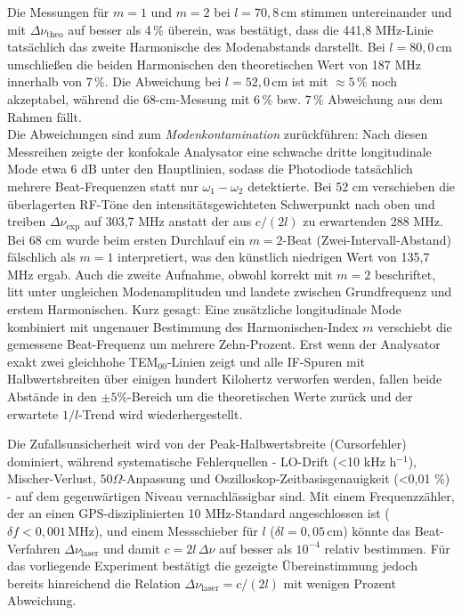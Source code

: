 Die Messungen für $m=1$ und $m=2$ bei $l=70{,}8\,\mathrm{cm}$ stimmen untereinander und mit $\Delta\nu_{\mathrm{theo}}$ auf besser als 4\,\% überein, was bestätigt, dass die 441{,}8 MHz-Linie tatsächlich das zweite Harmonische des Modenabstands darstellt. Bei $l=80{,}0\,\mathrm{cm}$ umschließen die beiden Harmonischen den theoretischen Wert von 187 MHz innerhalb von 7\,\%.  Die Abweichung bei $l=52{,}0\,\mathrm{cm}$ ist mit $\approx 5\,\%$ noch akzeptabel, während die 68-cm-Messung mit $6\,\%$ bsw. $7\,\%$ Abweichung aus dem Rahmen fällt.\\
Die Abweichungen sind zum \emph{Modenkontamination} zurückführen: Nach diesen Messreihen zeigte der konfokale Analysator eine schwache dritte longitudinale Mode etwa 6 dB unter den Hauptlinien, sodass die Photodiode tatsächlich mehrere Beat-Frequenzen statt nur $\omega_{1} - \omega_{2}$ detektierte. Bei 52 cm verschieben die überlagerten RF-Töne den intensitätsgewichteten Schwerpunkt nach oben und treiben $\Delta\nu_{\mathrm{exp}}$ auf 303,7 MHz anstatt der aus $c/(2l)$ zu erwartenden 288 MHz. Bei 68 cm wurde beim ersten Durchlauf ein $m=2$-Beat (Zwei-Intervall-Abstand) fälschlich als $m=1$ interpretiert, was den künstlich niedrigen Wert von 135,7 MHz ergab. Auch die zweite Aufnahme, obwohl korrekt mit $m=2$ beschriftet, litt unter ungleichen Modenamplituden und landete zwischen Grundfrequenz und erstem Harmonischen. Kurz gesagt: Eine zusätzliche longitudinale Mode kombiniert mit ungenauer Bestimmung des Harmonischen-Index $m$ verschiebt die gemessene Beat-Frequenz um mehrere Zehn-Prozent. Erst wenn der Analysator exakt zwei gleichhohe TEM$_{00}$-Linien zeigt und alle IF-Spuren mit Halbwertsbreiten über einigen hundert Kilohertz verworfen werden, fallen beide Abstände in den $\pm5\%$-Bereich um die theoretischen Werte zurück und der erwartete $1/l$-Trend wird wiederhergestellt.


Die Zufallsunsicherheit wird von der Peak-Halbwertsbreite (Cursorfehler) dominiert, während systematische Fehlerquellen - LO-Drift (<10 kHz h$^{-1}$), Mischer-Verlust, $50 \Omega$-Anpassung und Oszilloskop-Zeitbasisgenauigkeit (<0{,}01 \%) - auf dem gegenwärtigen Niveau vernachlässigbar sind. Mit einem Frequenzzähler, der an einen GPS-disziplinierten 10 MHz-Standard angeschlossen ist ($\delta f<0{,}001\,\mathrm{MHz}$), und einem Messschieber für $l$ ($\delta l=0{,}05\,\mathrm{cm}$) könnte das Beat-Verfahren $\Delta\nu_{\mathrm{laser}}$ und damit $c=2l\,\Delta\nu$ auf besser als $10^{-4}$ relativ bestimmen. Für das vorliegende Experiment bestätigt die gezeigte Übereinstimmung jedoch bereits hinreichend die Relation $\Delta\nu_{\mathrm{laser}} = c/(2l)$ mit wenigen Prozent Abweichung.

